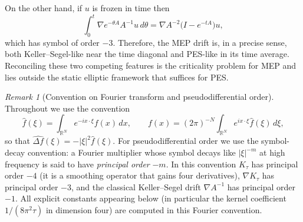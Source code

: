 \documentclass[11pt,reqno]{amsart}
\theoremstyle{definition}
\theoremstyle{remark}
\newtheorem{remark}[theorem]{Remark}
\newcommand{\R}{\mathbb{R}}
\begin{document}
On the other hand, if $u$ is frozen in time then
\begin{equation}\label{eq:MEP-frozen-average-intro}
        \int_{0}^{t}\nabla e^{-\theta A}A^{-1}u\,d\theta
        =\nabla A^{-2}\bigl(I-e^{-tA}\bigr)u,
\end{equation}
which has symbol of order $-3$. Therefore, the MEP drift is, in a precise sense, both Keller--Segel-like near the time diagonal and PES-like in its time average. Reconciling these two competing features is the criticality problem for MEP and lies outside the static elliptic framework that suffices for PES.

\begin{remark}[Convention on Fourier transform and pseudodifferential order]\label{conv:order}
Throughout we use the convention
\[
        \widehat f(\xi)=\int_{\R^{N}}e^{-ix\cdot\xi}f(x)\,dx,
        \qquad
        f(x)=(2\pi)^{-N}\int_{\R^{N}}e^{ix\cdot\xi}\widehat f(\xi)\,d\xi,
\]
so that $\widehat{\Delta f}(\xi)=-|\xi|^{2}\widehat f(\xi)$. For pseudodifferential order we use the symbol-decay convention: a Fourier multiplier whose symbol decays like $|\xi|^{-m}$ at high frequency is said to have \emph{principal order} $-m$. In this convention $K_\tau$ has principal order $-4$ (it is a smoothing operator that gains four derivatives), $\nabla K_\tau$ has principal order $-3$, and the classical Keller--Segel drift $\nabla A^{-1}$ has principal order $-1$. All explicit constants appearing below (in particular the kernel coefficient $1/(8\pi^{2}\tau)$ in dimension four) are computed in this Fourier convention.
\end{remark}
\end{document}
